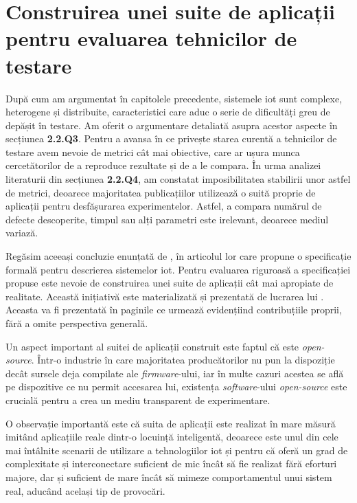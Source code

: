 \chapter{Construirea unei suite de aplicații pentru evaluarea 
tehnicilor de testare}

După cum am argumentat în capitolele precedente, sistemele \acrshort{iot} sunt complexe, heterogene și distribuite, caracteristici care aduc o serie de dificultăți greu de depășit în testare. Am oferit o argumentare detaliată asupra acestor aspecte în secțiunea \textbf{2.2.Q3}. Pentru a avansa în ce privește starea curentă a tehnicilor de testare avem nevoie de metrici cât mai obiective, care ar ușura munca cercetătorilor de a reproduce rezultate și de a le compara. În urma analizei literaturii din secțiunea \textbf{2.2.Q4}, am constatat imposibilitatea stabilirii unor astfel de metrici, deoarece majoritatea publicațiilor utilizează o suită proprie de aplicații pentru desfășurarea experimentelor. Astfel, a compara numărul de defecte descoperite, timpul sau alți parametri este irelevant, deoarece mediul variază. 

Regăsim aceeași concluzie enunțată de \cite{Paduraru2021}, în articolul lor care propune o specificație formală pentru descrierea sistemelor \acrshort{iot}. Pentru evaluarea riguroasă a specificației propuse este nevoie de construirea unei suite de aplicații cât mai apropiate de realitate. Această inițiativă este materializată și prezentată de lucrarea lui \cite{Cristea2022}. Aceasta va fi prezentată în paginile ce urmează evidențiind contribuțiile proprii, fără a omite perspectiva generală. 

Un aspect important al suitei de aplicații construit este faptul că este \textit{open-source}. Într-o industrie în care majoritatea producătorilor nu pun la dispoziție decât sursele deja compilate ale \textit{firmware}-ului, iar în multe cazuri acestea se află pe dispozitive ce nu permit accesarea lui, existența \textit{software}-ului \textit{open-source} este crucială pentru a crea un mediu transparent de experimentare. 

O observație importantă este că suita de aplicații este realizat în mare măsură imitând aplicațiile reale dintr-o locuință inteligentă, deoarece este unul din cele mai întâlnite scenarii de utilizare a tehnologiilor \acrshort{iot} și pentru că oferă un grad de complexitate și interconectare suficient de mic încât să fie realizat fără eforturi majore, dar și suficient de mare încât să mimeze comportamentul unui sistem real, aducând același tip de provocări.

